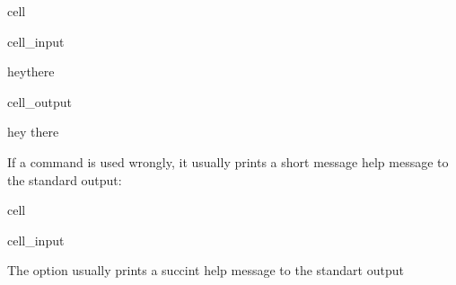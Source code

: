 \documentclass[a4paper,10pt,english]{jupyterBook}
\begin{document}
\begin{sphinxuseclass}{cell}\begin{sphinxVerbatimInput}

\begin{sphinxuseclass}{cell_input}
\begin{sphinxVerbatim}[commandchars=\\\{\}]
heythere
\end{sphinxVerbatim}

\end{sphinxuseclass}\end{sphinxVerbatimInput}
\begin{sphinxVerbatimOutput}

\begin{sphinxuseclass}{cell_output}
\begin{sphinxVerbatim}[commandchars=\\\{\}]
hey there
\end{sphinxVerbatim}

\end{sphinxuseclass}\end{sphinxVerbatimOutput}

\end{sphinxuseclass}
\sphinxAtStartPar
If a command is used wrongly, it usually prints a short message help message to the standard output:

\begin{sphinxuseclass}{cell}\begin{sphinxVerbatimInput}

\begin{sphinxuseclass}{cell_input}
\begin{sphinxVerbatim}[commandchars=\\\{\}]
\end{sphinxVerbatim}

\end{sphinxuseclass}\end{sphinxVerbatimInput}

\end{sphinxuseclass}
\sphinxAtStartPar
The option  usually prints a succint help message to the standart output
\end{document}
